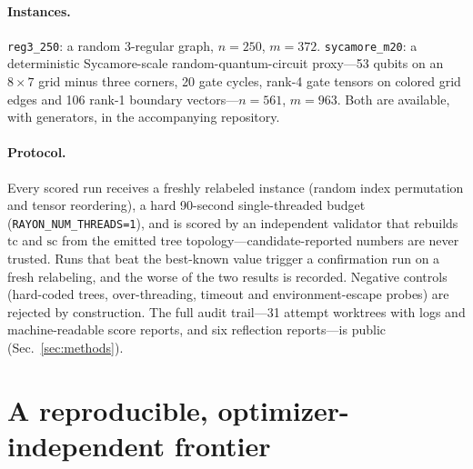 \documentclass[a4paper,11pt,noarxiv]{quantumarticle}
\newcommand{\tc}{\mathrm{tc}}
\newcommand{\sczz}{\mathrm{sc}}
\begin{document}
\paragraph{Instances.} \texttt{reg3\_250}: a random 3-regular graph,
$n=250$, $m=372$. \texttt{sycamore\_m20}: a deterministic Sycamore-scale
random-quantum-circuit proxy---53 qubits on an $8\times 7$ grid minus three
corners, 20 gate cycles, rank-4 gate tensors on colored grid edges and 106
rank-1 boundary vectors---$n=561$, $m=963$. Both are available, with
generators, in the accompanying repository.

\paragraph{Protocol.} Every scored run receives a freshly relabeled instance
(random index permutation and tensor reordering), a hard 90-second
single-threaded budget (\texttt{RAYON\_NUM\_THREADS=1}), and is scored by an
independent validator that rebuilds $\tc$ and $\sczz$ from the emitted tree
topology---candidate-reported numbers are never trusted. Runs that beat the
best-known value trigger a confirmation run on a fresh relabeling, and the
worse of the two results is recorded. Negative controls (hard-coded trees,
over-threading, timeout and environment-escape probes) are rejected by
construction. The full audit trail---31 attempt worktrees with logs and
machine-readable score reports, and six reflection reports---is public
(Sec.~\ref{sec:methods}).

\section{A reproducible, optimizer-independent frontier}
\label{sec:frontier}
\end{document}
